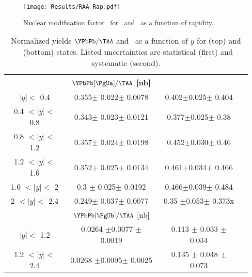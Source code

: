 \begin{figure}[h]
\begin{centering}       
  \texttt{[image: Results/RAA\_Rap.pdf]}
  \caption{Nuclear modification factor \RAA\ for \PgUa\ and \PgUb\ 
  as a function of rapidity.}
  \label{fig:raarap} 
\end{centering}
\end{figure}

\begin{table}[hbtp]
\begin{centering}
\begin{tabular}{|c|c|c|c|}                                      
\hline
& $\YPbPb[\PgUa]/\TAA$ [nb] & \RAA[\PgUa]  \\
\hline
$|y| <$ 0.4        & 0.355$\pm$ 0.022$\pm$  0.0078 & 0.402$\pm$0.025$\pm$ 0.404\\  
0.4 $< |y| <$ 0.8  & 0.343$\pm$ 0.023$\pm$  0.0121 & 0.377$\pm$0.025$\pm$ 0.38 \\  
0.8 $< |y| <$ 1.2  & 0.357$\pm$ 0.024$\pm$  0.0198 & 0.452$\pm$0.030$\pm$ 0.46\\  
1.2 $< |y| <$ 1.6  & 0.352$\pm$ 0.025$\pm$  0.0134 & 0.461$\pm$0.034$\pm$ 0.466\\  
1.6 $< |y| <$ 2    & 0.3  $\pm$ 0.025$\pm$  0.0192 & 0.466$\pm$0.039$\pm$ 0.484\\  
2 $< |y| <$ 2.4    & 0.249$\pm$ 0.037$\pm$  0.0077 & 0.35 $\pm$0.053$\pm$ 0.373x \\  
\hline   


\hline
& $\YPbPb[\PgUb]/\TAA$ [nb] & \RAA[\PgUb]  \\
\hline
$|y| <$ 1.2       & 0.0264 $\pm$0.0077 $\pm$ 0.0019 & 0.113 $\pm$ 0.033 $\pm$ 0.034 \\  
1.2 $< |y| <$ 2.4 & 0.0268 $\pm$0.0095$\pm$  0.0025 & 0.135 $\pm$ 0.048 $\pm$ 0.073  \\  
\hline

\end{tabular}
\caption{Normalized yields $\YPbPb/\TAA$ and \RAA\ as a function of $y$ for \PgUa (top) and \PgUb\ (bottom) states. Listed
uncertainties are statistical (first) and systematic (second).} 
\label{tab:CSaaraptab} 
\end{centering}
\end{table}

